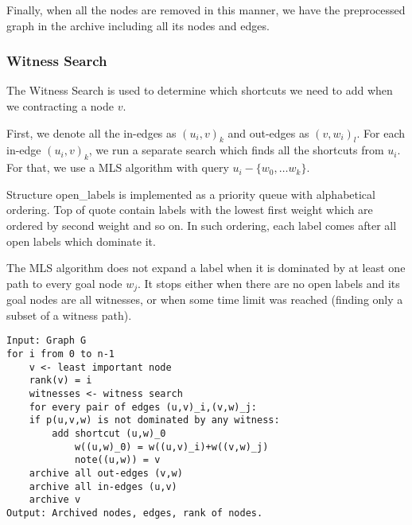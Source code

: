 Finally, when all the nodes are removed in this manner, we have the preprocessed graph in the archive including all its nodes and edges.

\subsubsection{Witness Search}
The Witness Search is used to determine which shortcuts we need to add when we contracting a node $v$. 

First, we denote all the in-edges as $(u_i,v)_k$ and out-edges as $(v,w_i)_l$. For each in-edge $(u_i,v)_k$, we run a separate search which finds all the shortcuts from $u_i$. For that, we use a MLS algorithm with query $u_i-\{w_0,\dots w_k\}$. 

Structure open\_labels is implemented as a priority queue with alphabetical ordering. 
Top of quote contain labels with the lowest first weight which are ordered by second weight and so on. In such ordering, each label comes after all open labels which dominate it.

The MLS algorithm does not expand a label when it is dominated by at least one path to every goal node $w_j$. It stops either when there are no open labels and its goal nodes are all witnesses,
or when some time limit was reached (finding only a subset of a witness path). 

\renewcommand{\lstlistingname}{Pseudocode}
\begin{lstlisting}[caption={MCHp},label=MCHp,captionpos=t,float,abovecaptionskip=-\medskipamount]
Input: Graph G
for i from 0 to n-1
    v <- least important node
    rank(v) = i
    witnesses <- witness search
    for every pair of edges (u,v)_i,(v,w)_j:
    if p(u,v,w) is not dominated by any witness:
        add shortcut (u,w)_0
            w((u,w)_0) = w((u,v)_i)+w((v,w)_j)
            note((u,w)) = v
    archive all out-edges (v,w) 
    archive all in-edges (u,v)
    archive v
Output: Archived nodes, edges, rank of nodes.
\end{lstlisting}
